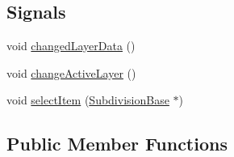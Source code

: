 \subsection*{Signals}
\begin{DoxyCompactItemize}
\item 
void \hyperlink{classShipCAD_1_1SubdivisionSurface_a5598e484d5deddfa353ddc4f02d3b004}{changed\-Layer\-Data} ()
\item 
void \hyperlink{classShipCAD_1_1SubdivisionSurface_aad7f3abd89252d503b7d21ca306436d4}{change\-Active\-Layer} ()
\item 
void \hyperlink{classShipCAD_1_1SubdivisionSurface_a83bf6f16944165a6e96a1f9387b783e7}{select\-Item} (\hyperlink{classShipCAD_1_1SubdivisionBase}{Subdivision\-Base} $\ast$)
\end{DoxyCompactItemize}
\subsection*{Public Member Functions}
